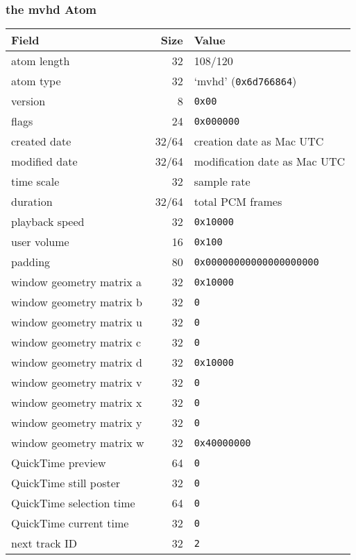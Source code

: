 \clearpage

\subsubsection{the mvhd Atom}

\begin{table}[h]
\begin{tabular}{|l|r|l|}
\hline
Field & Size & Value \\
\hline
atom length & 32 & 108/120 \\
atom type & 32 & `mvhd' (\texttt{0x6d766864}) \\
\hline
version & 8 & \texttt{0x00} \\
flags & 24 & \texttt{0x000000} \\
created date & 32/64 & creation date as Mac UTC \\
modified date & 32/64 & modification date as Mac UTC \\
time scale & 32 & sample rate \\
duration & 32/64 & total PCM frames \\
playback speed & 32 & \texttt{0x10000} \\
user volume & 16 & \texttt{0x100} \\
padding & 80 & \texttt{0x00000000000000000000} \\
window geometry matrix a & 32 & \texttt{0x10000} \\
window geometry matrix b & 32 & \texttt{0} \\
window geometry matrix u & 32 & \texttt{0} \\
window geometry matrix c & 32 & \texttt{0} \\
window geometry matrix d & 32 & \texttt{0x10000} \\
window geometry matrix v & 32 & \texttt{0} \\
window geometry matrix x & 32 & \texttt{0} \\
window geometry matrix y & 32 & \texttt{0} \\
window geometry matrix w & 32 & \texttt{0x40000000} \\
QuickTime preview & 64 & \texttt{0} \\
QuickTime still poster & 32 & \texttt{0} \\
QuickTime selection time & 64 & \texttt{0} \\
QuickTime current time & 32 & \texttt{0} \\
next track ID & 32 & \texttt{2} \\
\hline
\end{tabular}
\end{table}

